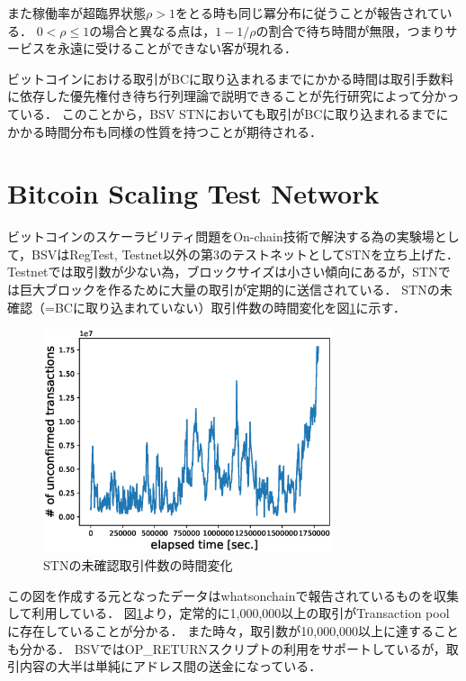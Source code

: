\documentclass[graybox]{svmult}
\begin{document}
また稼働率が超臨界状態$\rho > 1$をとる時も同じ冪分布に従うことが報告されている．
$0 < \rho \le 1$の場合と異なる点は，$1-1/\rho$の割合で待ち時間が無限，つまりサービスを永遠に受けることができない客が現れる．

ビットコインにおける取引がBCに取り込まれるまでにかかる時間は取引手数料に依存した優先権付き待ち行列理論で説明できることが先行研究によって分かっている\cite{KK2019}．
このことから，BSV STNにおいても取引がBCに取り込まれるまでにかかる時間分布も同様の性質を持つことが期待される．




\section{Bitcoin Scaling Test Network}
\label{sec:stn}

ビットコインのスケーラビリティ問題をOn-chain技術で解決する為の実験場として，BSVはRegTest, Testnet以外の第3のテストネットとしてSTNを立ち上げた．
Testnetでは取引数が少ない為，ブロックサイズは小さい傾向にあるが，STNでは巨大ブロックを作るために大量の取引が定期的に送信されている．
STNの未確認（=BCに取り込まれていない）取引件数の時間変化を図\ref{fig:unconfirmed_tx}に示す．
%
\begin{figure}[t]
  \vspace{-45mm}
  \begin{center}
    \includegraphics[width=85mm]{time_vs_tx-plot.eps}
  \end{center}
  \vspace{45mm}
  \caption{STNの未確認取引件数の時間変化}
  \label{fig:unconfirmed_tx}
\end{figure}
%


この図を作成する元となったデータはwhatsonchain\cite{woc}で報告されているものを収集して利用している．
図\ref{fig:unconfirmed_tx}より，定常的に1,000,000以上の取引がTransaction poolに存在していることが分かる．
また時々，取引数が10,000,000以上に達することも分かる．
BSVではOP\_RETURNスクリプトの利用をサポートしているが，取引内容の大半は単純にアドレス間の送金になっている．
\end{document}
